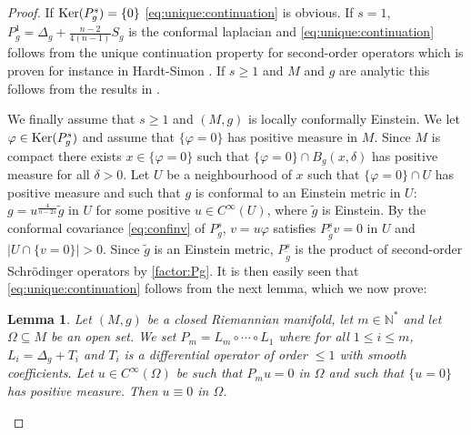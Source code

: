 \documentclass[10pt]{amsart}
\numberwithin{equation}{section}
\def\ker{{\mathop{\rm Ker}}}
\newcommand{\vp}{\varphi}
\theoremstyle{plain}
\newtheorem{lemme}{Lemma}[section]%
\theoremstyle{remark}
\begin{document}
\begin{proof}
If $\ker(P_g^s) = \{0\}$ \eqref{eq:unique:continuation} is obvious. If $s=1$, $P_g^1 = \Delta_g + \frac{n-2}{4(n-1)}S_g$ is the conformal laplacian and \eqref{eq:unique:continuation} follows from the unique continuation property for second-order operators which is proven for instance in  Hardt-Simon \cite[Theorem 1.10]{HardtSimon}. If $s \ge 1$ and $M$ and $g$ are analytic this follows from the results in \cite{Kukavica}. 

We finally assume that $s \ge 1$ and $(M,g)$ is locally conformally Einstein. We let $\vp \in \ker(P_g^s)$ and assume that $\{ \vp = 0\}$ has positive measure in $M$. Since $M$ is compact there exists $x \in \{ \vp = 0 \}$ such that $\{\vp = 0 \} \cap B_g(x, \delta)$ has positive measure for all $\delta >0$. Let $U$ be a neighbourhood of $x$ such that $\{\vp = 0 \} \cap U$ has positive measure and such that $g$ is conformal to an Einstein metric in $U$: $g = u^{ \frac{4}{n-2s}} \tilde{g}$ in $U$ for some positive $u \in C^\infty(U)$, where $\tilde g$ is Einstein. By the conformal covariance \eqref{eq:confinv} of $P_g^s$,  $v = u \vp$ satisfies $P_{\tilde{g}}^s v = 0$ in $U$ and $|U \cap \{v = 0\} | >0$.  Since $\tilde{g}$ is an Einstein metric, $P_{\tilde{g}}^s$ is the product of second-order Schr\"odinger operators by \eqref{factor:Pg}. It is then easily seen that \eqref{eq:unique:continuation} follows from the next lemma, which we now prove: 

\begin{lemme} %
Let $(M,g)$ be a closed Riemannian manifold, let $m\in \mathbb{N}^*$ and let $\Omega \subseteq M$ be an open set. We set $P_m = L_m \circ \cdots \circ L_1$ where for all $1\leq i \leq m$, $L_i = \Delta_g + T_i$ and $T_i$ is a differential operator of order $\leq 1$ with smooth coefficients. Let $u \in C^\infty(\Omega)$ be such that $P_m u = 0$ in $\Omega$ and such that $\{ u = 0 \} $ has positive measure. Then $u \equiv 0$ in $\Omega$. 
\end{lemme}


\end{proof}
\end{document}

